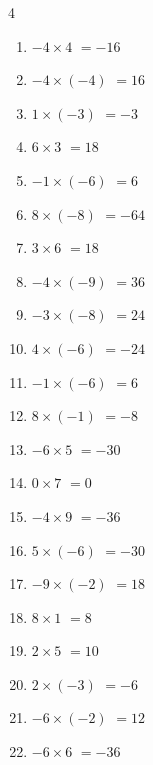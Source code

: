 \begin{multicols}{4}
\begin{enumerate}
  \item $-4\times 4$
        $=-16$

  \item $-4\times (-4)$
        $=16$

  \item $1\times (-3)$
        $=-3$

  \item $6\times 3$
        $=18$

  \item $-1\times (-6)$
        $=6$

  \item $8\times (-8)$
        $=-64$

  \item $3\times 6$
        $=18$

  \item $-4\times (-9)$
        $=36$

\columnbreak %

  \item $-3\times (-8)$
        $=24$

  \item $4\times (-6)$
        $=-24$

  \item $-1\times (-6)$
        $=6$

  \item $8\times (-1)$
        $=-8$

  \item $-6\times 5$
        $=-30$

  \item $0\times 7$
        $=0$

  \item $-4\times 9$
        $=-36$

  \item $5\times (-6)$
        $=-30$

  \item $-9\times (-2)$
        $=18$

  \item $8\times 1$
        $=8$

  \item $2\times 5$
        $=10$

  \item $2\times (-3)$
        $=-6$

  \item $-6\times (-2)$
        $=12$

  \item $-6\times 6$
        $=-36$


\end{enumerate}
\end{multicols}
